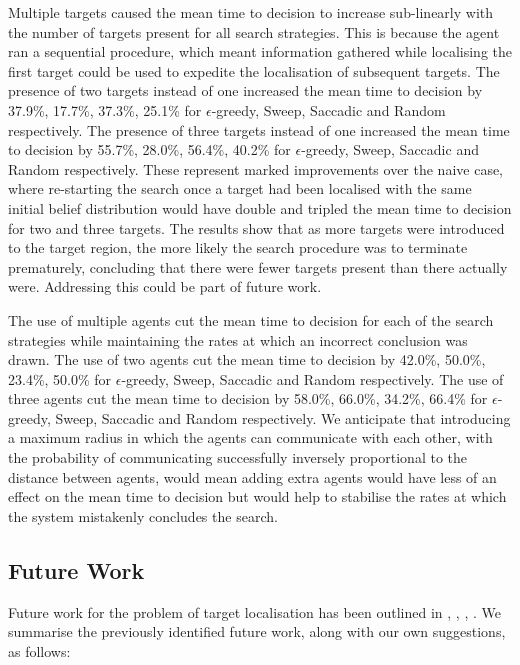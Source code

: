Multiple targets caused the mean time to decision to increase sub-linearly with the number of targets present for all search strategies. This is because the agent ran a sequential procedure, which meant information gathered while localising the first target could be used to expedite the localisation of subsequent targets. The presence of two targets instead of one increased the mean time to decision by 37.9\%, 17.7\%, 37.3\%, 25.1\% for $\epsilon$-greedy, Sweep, Saccadic and Random respectively. The presence of three targets instead of one increased the mean time to decision by 55.7\%,  28.0\%, 56.4\%, 40.2\% for $\epsilon$-greedy, Sweep, Saccadic and Random respectively. These represent marked improvements over the naive case, where re-starting the search once a target had been localised with the same initial belief distribution would have double and tripled the mean time to decision for two and three targets. The results show that as more targets were introduced to the target region, the more likely the search procedure was to terminate prematurely, concluding that there were fewer targets present than there actually were. Addressing this could be part of future work.\par

The use of multiple agents cut the mean time to decision for each of the search strategies while maintaining the rates at which an incorrect conclusion was drawn. The use of two agents cut the mean time to decision by 42.0\%, 50.0\%, 23.4\%, 50.0\% for $\epsilon$-greedy, Sweep, Saccadic and Random respectively. The use of three agents cut the mean time to decision by 58.0\%, 66.0\%, 34.2\%, 66.4\% for $\epsilon$-greedy, Sweep, Saccadic and Random respectively. We anticipate that introducing a maximum radius in which the agents can communicate with each other, with the probability of communicating successfully inversely proportional to the distance between agents, would mean adding extra agents would have less of an effect on the mean time to decision but would help to stabilise the rates at which the system mistakenly concludes the search.

\subsection{Future Work}
Future work for the problem of target localisation has been outlined in \cite{Chung2007ASearch}, \cite{Chung2008Multi-agentFramework}, \cite{Chung2012AnalysisStrategies}, \cite{Kriheli2016OptimalInspections}. We summarise the previously identified future work, along with our own suggestions, as follows:


